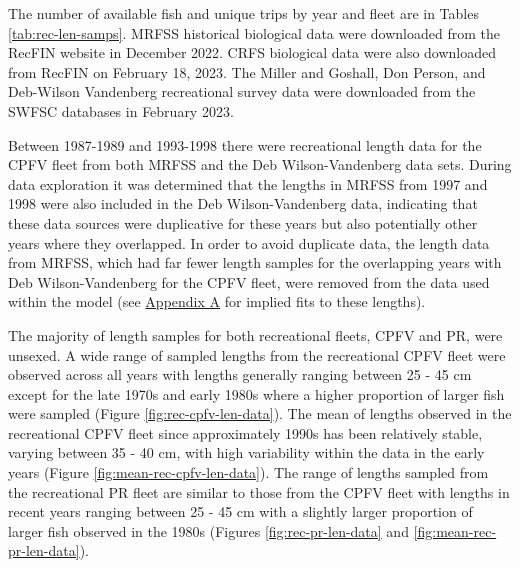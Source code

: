 \documentclass[11pt,
  english,
  letterpaper,
]{article}
\begin{document}
The number of available fish and unique trips by year and fleet are in Tables \ref{tab:rec-len-samps}. MRFSS historical biological data were downloaded from the RecFIN website in December 2022. CRFS biological data were also downloaded from RecFIN on February 18, 2023. The Miller and Goshall, Don Person, and Deb-Wilson Vandenberg recreational survey data were downloaded from the SWFSC databases in February 2023.

Between 1987-1989 and 1993-1998 there were recreational length data for the CPFV fleet from both MRFSS and the Deb Wilson-Vandenberg data sets. During data exploration it was determined that the lengths in MRFSS from 1997 and 1998 were also included in the Deb Wilson-Vandenberg data, indicating that these data sources were duplicative for these years but also potentially other years where they overlapped. In order to avoid duplicate data, the length data from MRFSS, which had far fewer length samples for the overlapping years with Deb Wilson-Vandenberg for the CPFV fleet, were removed from the data used within the model (see \protect\hyperlink{excluded-data}{Appendix A} for implied fits to these lengths).

The majority of length samples for both recreational fleets, CPFV and PR, were unsexed. A wide range of sampled lengths from the recreational CPFV fleet were observed across all years with lengths generally ranging between 25 - 45 cm except for the late 1970s and early 1980s where a higher proportion of larger fish were sampled (Figure \ref{fig:rec-cpfv-len-data}). The mean of lengths observed in the recreational CPFV fleet since approximately 1990s has been relatively stable, varying between 35 - 40 cm, with high variability within the data in the early years (Figure \ref{fig:mean-rec-cpfv-len-data}). The range of lengths sampled from the recreational PR fleet are similar to those from the CPFV fleet with lengths in recent years ranging between 25 - 45 cm with a slightly larger proportion of larger fish observed in the 1980s (Figures \ref{fig:rec-pr-len-data} and \ref{fig:mean-rec-pr-len-data}).
\end{document}
